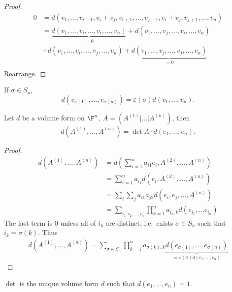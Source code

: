 \documentclass[a4paper]{article}
\theoremstyle{definition}
\begin{document}
\begin{proof}
  \begin{align*}
    0 &= d(v_1, \dots, v_{i-1}, v_i + v_j, v_{i+1}, \dots, v_{j-1}, v_i + v_j, v_{j + 1}, \dots, v_n) \\
      &= \underbrace{d(v_1, \dots, v_i, \dots, v_i, \dots, v_n)}_{ = 0} + d(v_1, \dots, v_j, \dots, v_i, \dots, v_n) \\
      &+ d(v_1, \dots, v_i, \dots, v_j, \dots, v_n) + \underbrace{d(v_1, \dots, v_j, \dots, v_j, \dots, v_n)}_{ = 0} \\
  \end{align*}
  Rearrange.
\end{proof}

\begin{corollary}
  If \(\sigma \in S_n\),
  \[
    d(v_{\sigma(1)}, \dots, v_{\sigma(n)}) = \varepsilon(\sigma) d(v_1, \dots, v_n).
  \]
\end{corollary}

\begin{theorem}
  Let \(d\) be a volume form on \(\F^n\), \(A = (A^{(1)}|\dots | A^{(n)})\), then
  \[
    d(A^{(1)}, \dots, A^{(n)}) = \det A \cdot d(e_1, \dots, e_n).
  \]
\end{theorem}

\begin{proof}
  \begin{align*}
    d(A^{(1)}, \dots, A^{(n)}) &= d \left( \sum_{i=1}^{n} a_{i1}e_i, A^{(2)}, \dots, A^{(n)} \right) \\
                               &= \sum_{i = 1}^{n}a_{i_1} d(e_i, A^{(2)}, \dots, A^{(n)}) \\
                               &= \sum_{i}^{} \sum_{j}^{ } a_{i1} a_{j2} d(e_i, e_j, \dots, A^{(n)}) \\
                               &= \sum_{i_1, i_2, \dots, i_n}^{ } \prod_{k = 1}^{n} a_{{i_k},k} d(e_{i_1}, \dots e_{i_n})
\end{align*}
The last term is \(0\) unless all of \(i_k\) are distinct, i.e.\ exists \(\sigma \in S_n\) such that \(i_k = \sigma(k)\). Thus
\begin{align*}
  d(A^{(1)}, \dots, A^{(n)}) = \sum_{\sigma \in S_n}^{ } \prod_{k = 1}^{n} a_{\sigma(k), k} \underbrace{d(e_{\sigma(1)}, \dots, e_{\sigma(n)})}_{= \varepsilon(\sigma) d(e_1, \dots, e_n)}
\end{align*}
\end{proof}

\begin{corollary}
  \(\det\) is the unique volume form \(d\) such that \(d(e_1, \dots, e_n) = 1\).
\end{corollary}
\end{document}
